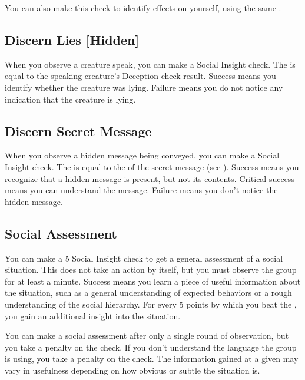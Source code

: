         You can also make this check to identify  effects on yourself, using the same .

    \subsection{Discern Lies [Hidden]}
        When you observe a creature speak, you can make a Social Insight check.
        The  is equal to the speaking creature's Deception check result.
        Success means you identify whether the creature was lying.
        Failure means you do not notice any indication that the creature is lying.

    \subsection{Discern Secret Message}
        When you observe a hidden message being conveyed, you can make a Social Insight check.
        The  is equal to the  of the secret message (see ).
        Success means you recognize that a hidden message is present, but not its contents.
        Critical success means you can understand the message.
        Failure means you don't notice the hidden message.

    \subsection{Social Assessment}\label{Social Assessment}
        You can make a  5 Social Insight check to get a general assessment of a social situation.
        This does not take an action by itself, but you must observe the group for at least a minute.
        Success means you learn a piece of useful information about the situation, such as a general understanding of expected behaviors or a rough understanding of the social hierarchy.
        For every 5 points by which you beat the , you gain an additional insight into the situation.

        You can make a social assessment after only a single round of observation, but you take a  penalty on the check.
        If you don't understand the language the group is using, you take a  penalty on the check.
        The information gained at a given  may vary in usefulness depending on how obvious or subtle the situation is.

